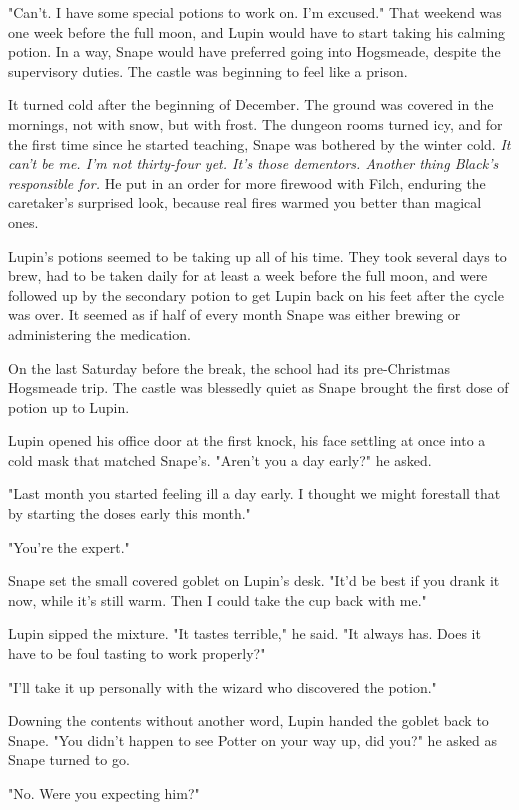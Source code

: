 "Can't. I have some special potions to work on. I'm excused." That weekend was one week before the full moon, and Lupin would have to start taking his calming potion. In a way, Snape would have preferred going into Hogsmeade, despite the supervisory duties. The castle was beginning to feel like a prison.

It turned cold after the beginning of December. The ground was covered in the mornings, not with snow, but with frost. The dungeon rooms turned icy, and for the first time since he started teaching, Snape was bothered by the winter cold. \emph{It can't be me. I'm not thirty-four yet. It's those dementors. Another thing Black's responsible for.} He put in an order for more firewood with Filch, enduring the caretaker's surprised look, because real fires warmed you better than magical ones.

Lupin's potions seemed to be taking up all of his time. They took several days to brew, had to be taken daily for at least a week before the full moon, and were followed up by the secondary potion to get Lupin back on his feet after the cycle was over. It seemed as if half of every month Snape was either brewing or administering the medication.

On the last Saturday before the break, the school had its pre-Christmas Hogsmeade trip. The castle was blessedly quiet as Snape brought the first dose of potion up to Lupin.

Lupin opened his office door at the first knock, his face settling at once into a cold mask that matched Snape's. "Aren't you a day early?" he asked.

"Last month you started feeling ill a day early. I thought we might forestall that by starting the doses early this month."

"You're the expert."

Snape set the small covered goblet on Lupin's desk. "It'd be best if you drank it now, while it's still warm. Then I could take the cup back with me."

Lupin sipped the mixture. "It tastes terrible," he said. "It always has. Does it have to be foul tasting to work properly?"

"I'll take it up personally with the wizard who discovered the potion."

Downing the contents without another word, Lupin handed the goblet back to Snape. "You didn't happen to see Potter on your way up, did you?" he asked as Snape turned to go.

"No. Were you expecting him?"

